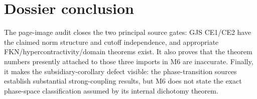 \documentclass[10pt,a4paper]{article}
\begin{document}
\clearpage
\section{Dossier conclusion}

The page-image audit closes the two principal source gates: GJS CE1/CE2 have the claimed
norm structure and cutoff independence, and appropriate FKN/hypercontractivity/domain
theorems exist.  It also proves that the theorem numbers presently attached to those three
imports in M6 are inaccurate.  Finally, it makes the subsidiary-corollary defect visible:
the phase-transition sources establish substantial strong-coupling results, but M6 does not
state the exact phase-space classification assumed by its internal dichotomy theorem.
\end{document}

